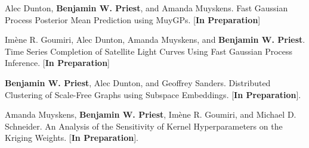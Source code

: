 \item Alec Dunton, \textbf{Benjamin W. Priest}, and Amanda Muyskens.
	Fast Gaussian Process Posterior Mean Prediction using MuyGPs.
	[\textbf{In Preparation}] 

\item Im\`{e}ne R. Goumiri, Alec Dunton, Amanda Muyskens, and \textbf{Benjamin W. Priest}.
	Time Series Completion of Satellite Light Curves Using Fast Gaussian Process Inference.
	[\textbf{In Preparation}]

\item \textbf{Benjamin W. Priest}, Alec Dunton, and Geoffrey Sanders.
	Distributed Clustering of Scale-Free Graphs using Subspace Embeddings. 
	[\textbf{In Preparation}].

\item Amanda Muyskens, \textbf{Benjamin W. Priest}, Im\`{e}ne R. Goumiri, and Michael D. Schneider.
	An Analysis of the Sensitivity of Kernel Hyperparameters on the Kriging Weights.
	[\textbf{In Preparation}].

